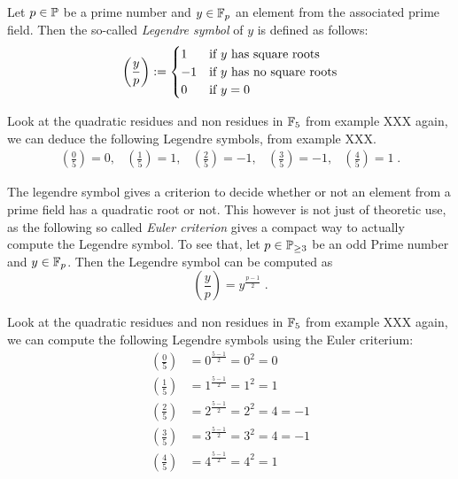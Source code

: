 Let $ p \in \mathbb{P} $ be a prime number and $ y \in \mathbb{F}_p $ an element from the associated prime field. Then the so-called \textit{Legendre symbol} of $ y $ is defined as follows:
\begin{equation}
\label{eq: Legendre-symbol}
\left (\frac{y}{p} \right): =
\begin{cases}
1 & \text{if $ y $ has square roots} \\
-1 & \text{if $ y $ has no square roots} \\
0 & \text{if $ y = 0 $}
\end{cases}
\end{equation}
\begin{example}
Look at the quadratic residues and non residues in $\mathbb{F}_5$ from example XXX again, we can deduce the following Legendre symbols, from example XXX.
$$
\begin{array}{ccccc}
\left (\frac{0}{5} \right) = 0, &
\left (\frac{1}{5} \right) = 1, &
\left (\frac{2}{5} \right) = -1, &
\left (\frac{3}{5} \right) = -1, &
\left (\frac{4}{5} \right) = 1 \;.
\end{array}
$$
\end{example}
The legendre symbol gives a criterion to decide whether or not an element from a prime field has a quadratic root or not. This however is not just of theoretic use, as the following so called \textit{Euler criterion} gives a compact way to actually compute the Legendre symbol. To see that, let $ p \in \mathbb{P}_{\geq 3} $ be an odd
Prime number and $ y \in \mathbb{F}_p $. Then the Legendre symbol can be computed as
\begin{equation}
\label{eq: Euler_criterium}
\left (\frac{y}{p} \right) = y^{\frac{p-1}{2}} \;.
\end{equation}
\begin{example}
Look at the quadratic residues and non residues in $\mathbb{F}_5$ from example XXX again, we can compute the following Legendre symbols using the Euler criterium:
\begin{align*}
\left (\frac{0}{5} \right) &= 0^{\frac{5-1}{2}}= 0^2=0\\
\left (\frac{1}{5} \right) &= 1^{\frac{5-1}{2}}= 1^2=1\\
\left (\frac{2}{5} \right) &= 2^{\frac{5-1}{2}}= 2^2=4 = -1\\
\left (\frac{3}{5} \right) &= 3^{\frac{5-1}{2}}= 3^2=4 =-1\\
\left (\frac{4}{5} \right) &= 4^{\frac{5-1}{2}}= 4^2=1
\end{align*}
\end{example}
